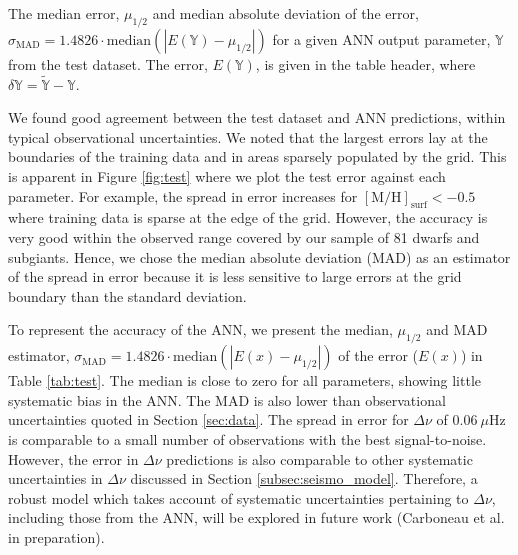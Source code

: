 \documentclass[fleqn,usenatbib]{mnras}
\newcommand{\dnu}{\ensuremath{\Delta\nu}}
\newcommand{\metallicity}{\ensuremath{[\mathrm{M}/\mathrm{H}]}}
\begin{document}
\begin{table}
	\centering
	\caption{The median error, $\mu_{1/2}$ and median absolute deviation of the error, $\sigma_\mathrm{MAD} = 1.4826\cdot\mathrm{median}(|E(\mathbb{Y}) - \mu_{1/2}|)$ for a given ANN output parameter, $\mathbb{Y}$ from the test dataset. The error, $E(\mathbb{Y})$, is given in the table header, where $\delta \mathbb{Y} = \widetilde{\mathbb{Y}} - \mathbb{Y}$.}
	\label{tab:test}
        
\end{table}

We found good agreement between the test dataset and ANN predictions, within typical observational uncertainties. We noted that the largest errors lay at the boundaries of the training data and in areas sparsely populated by the grid. This is apparent in Figure \ref{fig:test} where we plot the test error against each parameter. For example, the spread in error increases for $\metallicity_\mathrm{surf} < -0.5$ where training data is sparse at the edge of the grid. However, the accuracy is very good within the observed range covered by our sample of 81 dwarfs and subgiants. Hence, we chose the median absolute deviation (MAD) as an estimator of the spread in error because it is less sensitive to large errors at the grid boundary than the standard deviation.

To represent the accuracy of the ANN, we present the median, $\mu_{1/2}$ and MAD estimator, $\sigma_\mathrm{MAD} = 1.4826\cdot\mathrm{median}(|E(x) - \mu_{1/2}|)$ of the error ($E(x)$) in Table \ref{tab:test}. The median is close to zero for all parameters, showing little systematic bias in the ANN. The MAD is also lower than observational uncertainties quoted in Section \ref{sec:data}. The spread in error for $\dnu$ of $\SI{0.06}{\mu\Hz}$ is comparable to a small number of observations with the best signal-to-noise. However, the error in $\dnu$ predictions is also comparable to other systematic uncertainties in $\dnu$ discussed in Section \ref{subsec:seismo_model}. Therefore, a robust model which takes account of systematic uncertainties pertaining to $\dnu$, including those from the ANN, will be explored in future work (Carboneau et al. in preparation).
\end{document}
